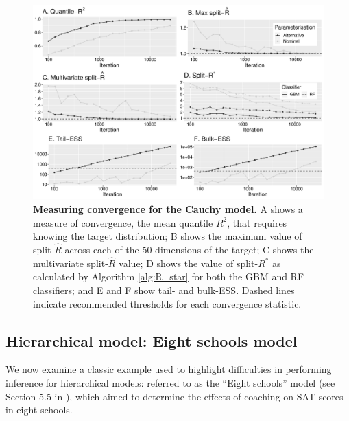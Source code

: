 \documentclass[ba]{imsart}
\numberwithin{equation}{section}
\theoremstyle{plain}
\begin{document}
\begin{figure}[!htb]
	\centerline{\includegraphics[width=1.0\textwidth]{cauchy_convergence.pdf}}
	\caption{\textbf{Measuring convergence for the Cauchy model.} A shows a measure of convergence, the mean quantile $R^2$, that requires knowing the target distribution; B shows the maximum value of split-$\widehat{R}$ across each of the 50 dimensions of the target; C shows the multivariate split-$\widehat{R}$ value; D shows the value of split-$R^*$ as calculated by Algorithm \ref{alg:R_star} for both the GBM and RF classifiers; and E and F show tail- and bulk-ESS. Dashed lines indicate recommended thresholds for each convergence statistic.}
	\label{fig:cauchy_convergence}
\end{figure}

\subsection{Hierarchical model: Eight schools model}\label{sec:eight_shools}
We now examine a classic example used to highlight difficulties in performing inference for hierarchical models: referred to as the ``Eight schools'' model (see Section 5.5 in \cite{gelman2013bayesian}), which aimed to determine the effects of coaching on SAT scores in eight schools. 
\end{document}

